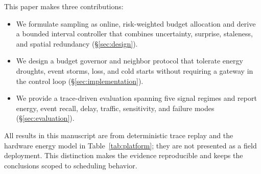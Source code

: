 This paper makes three contributions:

\begin{itemize}[leftmargin=*,itemsep=2pt,topsep=3pt]
  \item We formulate sampling as online, risk-weighted budget allocation and
  derive a bounded interval controller that combines uncertainty, surprise,
  staleness, and spatial redundancy (\S\ref{sec:design}).
  \item We design a budget governor and neighbor protocol that tolerate energy
  droughts, event storms, loss, and cold starts without requiring a gateway in
  the control loop (\S\ref{sec:implementation}).
  \item We provide a trace-driven evaluation spanning five signal regimes and
  report energy, event recall, delay, traffic, sensitivity, and failure modes
  (\S\ref{sec:evaluation}).
\end{itemize}

All results in this manuscript are from deterministic trace replay and the
hardware energy model in Table~\ref{tab:platform}; they are not presented as a
field deployment.  This distinction makes the evidence reproducible and keeps
the conclusions scoped to scheduling behavior.
